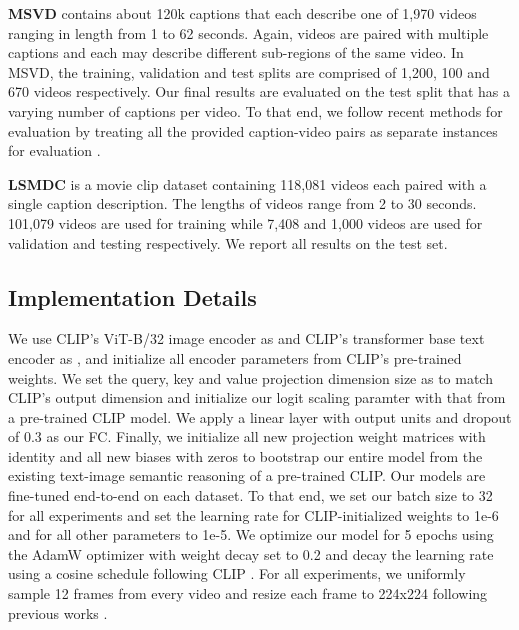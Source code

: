 \documentclass[10pt,twocolumn,letterpaper]{article}
\begin{document}
\textbf{MSVD} contains about 120k captions that each describe one of 1,970 videos ranging in length from 1 to 62 seconds. Again, videos are paired with multiple captions and each may describe different sub-regions of the same video. In MSVD, the training, validation and test splits are comprised of 1,200, 100 and 670 videos respectively. Our final results are evaluated on the test split that has a varying number of captions per video. To that end, we follow recent methods for evaluation by treating all the provided caption-video pairs as separate instances for evaluation \cite{portillo2021straightforward, luo2021clip4clip}.

\textbf{LSMDC} is a movie clip dataset containing 118,081 videos each paired with a single caption description. The lengths of videos range from 2 to 30 seconds. 101,079 videos are used for training while 7,408 and 1,000 videos are used for validation and testing respectively. We report all results on the test set. 
 
\subsection{Implementation Details}
We use CLIP's ViT-B/32 image encoder as  and CLIP's transformer base text encoder as , and initialize all encoder parameters from CLIP's pre-trained weights. We set the query, key and value projection dimension size as  to match CLIP's output dimension and initialize our logit scaling paramter  with that from a pre-trained CLIP model. We apply a linear layer with  output units and dropout \cite{srivastava2014dropout} of 0.3 as our FC. Finally, we initialize all new projection weight matrices with identity and all new biases with zeros to bootstrap our entire model from the existing text-image semantic reasoning of a pre-trained CLIP. Our models are fine-tuned end-to-end on each dataset. To that end, we set our batch size to 32 for all experiments and set the learning rate for CLIP-initialized weights to 1e-6 and for all other parameters to 1e-5. We optimize our model for 5 epochs using the AdamW optimizer \cite{loshchilov2017decoupled} with weight decay set to 0.2 and decay the learning rate using a
cosine schedule \cite{loshchilov2016sgdr} following CLIP \cite{radford2021learning}. For all experiments, we uniformly sample 12 frames from every video and resize each frame to 224x224 following previous works \cite{liu2019use, bain2021frozen, luo2021clip4clip}.
\end{document}
